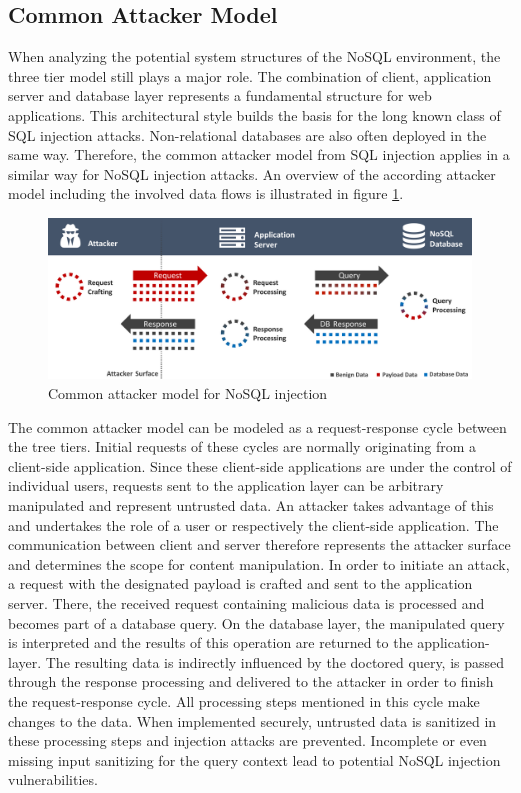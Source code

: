 \subsection{Common Attacker Model}
\label{sec:commonAttackerModel}

When analyzing the potential system structures of the NoSQL environment, the three tier model still plays a major role. The combination of client, application server and database layer represents a fundamental structure for web applications. This architectural style builds the basis for the long known class of SQL injection attacks. Non-relational databases are also often deployed in the same way. Therefore, the common attacker model from SQL injection applies in a similar way for NoSQL injection attacks. An overview of the according attacker model including the involved data flows is illustrated in figure \ref{fig:normalAttackerModel}.

\begin{figure}[h]
\centering
  \includegraphics[width=1\linewidth]{Images/attacker_model_normal}
  \caption{Common attacker model for NoSQL injection}
  \label{fig:normalAttackerModel}
\end{figure}

The common attacker model can be modeled as a request-response cycle between the tree tiers. Initial requests of these cycles are normally originating from a client-side application. Since these client-side applications are under the control of individual users, requests sent to the application layer can be arbitrary manipulated and represent untrusted data. An attacker takes advantage of this and undertakes the role of a user or respectively the client-side application. The communication between client and server therefore represents the attacker surface and determines the scope for content manipulation. In order to initiate an attack, a request with the designated payload is crafted and sent to the application server. There, the received request containing malicious data is processed and becomes part of a database query. On the database layer, the manipulated query is interpreted and the results of this operation are returned to the application-layer. The resulting data is indirectly influenced by the doctored query, is passed through the response processing and delivered to the attacker in order to finish the request-response cycle. All processing steps mentioned in this cycle make changes to the data. When implemented securely, untrusted data is sanitized in these processing steps and injection attacks are prevented. Incomplete or even missing input sanitizing for the query context lead to potential NoSQL injection vulnerabilities.\\

